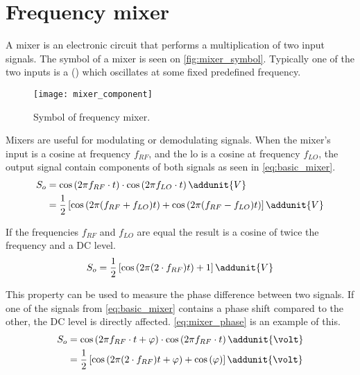 \section{Frequency mixer} \label{sec:tracking_mixer}

A mixer is an electronic circuit that performs a multiplication of two input signals. The symbol of a mixer is seen on \autoref{fig:mixer_symbol}. Typically one of the two inputs is a  () which oscillates at some fixed predefined frequency.
\begin{figure} [h!]
\centering
\texttt{[image: mixer\_component]}
\caption{Symbol of frequency mixer.}
\label{fig:mixer_symbol}
\end{figure}

Mixers are useful for modulating or demodulating signals. When the mixer's input is a cosine at frequency $f_{RF}$, and the \gls{lo} is a cosine at frequency $f_{LO}$, the output signal contain components of both signals as seen in \autoref{eq:basic_mixer}.
\begin{subequations}\label{eq:basic_mixer}
\begin{align} 
S_o &= \cos \left( {2\pi f_{RF} \cdot t} \right) \cdot \cos \left( {2\pi f_{LO} \cdot t} \right) \addunit{V}  \\
&= \frac{1}{2} \left[ \cos \left( {2\pi (f_{RF} + f_{LO}) t} \right) + \cos \left( {2\pi (f_{RF} - f_{LO}) t} \right) \right] \addunit{V}\label{eq:basic_mixer2}
\end{align}
\end{subequations}
\startexplain
{}
\stopexplain


If the frequencies $f_{RF}$ and $f_{LO}$ are equal the result is a cosine of twice the frequency and a DC level. 
\begin{equation}
S_o =\frac{1}{2} \left[ \cos \left( {2\pi (2 \cdot f_{RF}) t} \right) + 1 \right] \addunit{V} \label{eq:basic_mixerDC}
\end{equation}

This property can be used to measure the phase difference between two signals. If one of the signals from \autoref{eq:basic_mixer} contains a phase shift compared to the other, the DC level is directly affected. \autoref{eq:mixer_phase} is an example of this.
\begin{subequations} \label{eq:mixer_phase}
\begin{align} 
S_o &= \cos \left( {2\pi f_{RF} \cdot t + \varphi } \right) \cdot \cos \left( {2\pi f_{RF} \cdot t} \right) \addunit{\volt}  \\
&= \frac{1}{2}\left[ {\cos \left( {2\pi (2 \cdot f_{RF}) t + \varphi } \right) + \cos \left( \varphi  \right)} \right] \addunit{\volt}
\end{align}
\end{subequations} 

